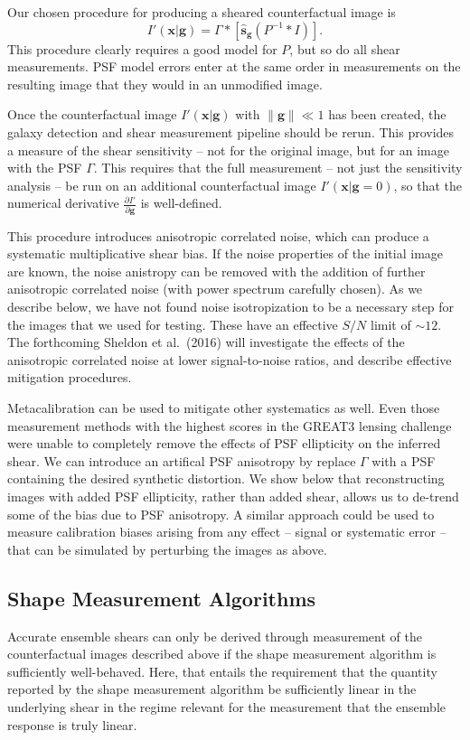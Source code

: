 \documentclass[iop]{emulateapj}
\begin{document}
Our chosen procedure for producing a sheared counterfactual image is
\begin{equation}
I'({\mathbf{x}}|\mathbf{g}) = \Gamma \ast \left[\hat{\mathbf{s}}_\mathbf{g} \left(P^{-1} \ast I \right)\right].
\end{equation}
This procedure clearly requires a good model for $P$, but so do all
shear measurements. PSF model errors enter at the
same order in measurements on the resulting image that they would in
an unmodified image.

Once the counterfactual image $I'(\mathbf{x}|\mathbf{g})$ with
$\|\mathbf{g}\| \ll 1$ has been created, the galaxy detection and
shear measurement pipeline should be rerun. This provides a measure of
the shear sensitivity -- not for the original image, but for an image
with the PSF $\Gamma$. This requires that the full measurement -- not
just the sensitivity analysis -- be run on an additional
counterfactual image $I'(\mathbf{x}|\mathbf{g}=0)$, so that the numerical
derivative $\frac{\partial I'}{\partial \mathbf{g}}$ is well-defined.

This procedure introduces anisotropic correlated noise, which can
produce a systematic multiplicative shear bias. If the noise
properties of the initial image are known, the noise anistropy can be
removed with the addition of further anisotropic correlated noise (with power spectrum carefully chosen). As we describe below, we
have not found noise isotropization to be a necessary step for the
images that we used for testing.  These have an effective $S/N$ limit
of $\sim 12$. The forthcoming Sheldon et al.~(2016) will investigate the
effects of the anisotropic correlated noise at lower signal-to-noise ratios, and
describe effective mitigation procedures.

Metacalibration can be used to mitigate other systematics as
well. Even those measurement methods with the highest scores in the
GREAT3 lensing challenge were unable to completely remove the effects
of PSF ellipticity on the inferred shear. We can introduce an
artifical PSF anisotropy by replace $\Gamma$ with a PSF containing the
desired synthetic distortion.  We show below that reconstructing
images with added PSF ellipticity, rather than added shear, allows us
to de-trend some of the bias due to PSF anisotropy. A similar approach
could be used to measure calibration biases arising from any effect --
signal or systematic error -- that can be simulated by perturbing the
images as above.


\subsection{Shape Measurement Algorithms}
\label{subsec:shapemeas}
Accurate ensemble shears can only be derived through measurement of
the counterfactual images described above if the shape measurement
algorithm is sufficiently well-behaved. Here, that entails the
requirement that the quantity reported by the shape measurement
algorithm be sufficiently linear in the underlying shear in the regime
relevant for the measurement that the ensemble response is truly
linear.
\end{document}
